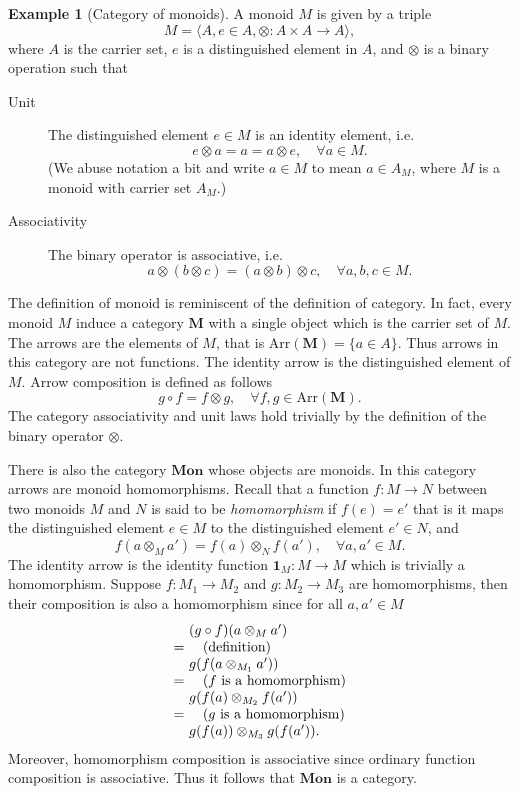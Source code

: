 \documentclass[10pt,twoside,a4paper]{article}
\makeatletter
\newcounter{theorem}
\theoremstyle{plain}
\theoremstyle{definition}
\newtheorem{example}{Example}[section]
\newcommand{\ba}{\begin{array}}
\newcommand{\ea}{\end{array}}
\newenvironment{derivation}{\small\[\ba{@{}r@{~}l@{}}}{\ea\]\normalsize\ignorespacesafterend}
\newcommand{\reason}[1]{\quad (\text{#1})}
\newcommand{\Id}[1]{%
  \ensuremath{\mathbf{1}_{#1}}%
}
\newcommand{\Arr}[1]{%
  \ensuremath{\mathrm{Arr}(#1)}%
}
\newcommand{\Catname}[1]{%
  \ensuremath{\mathbf{#1}}%
}
\newcommand{\Mon}[0]{\Catname{Mon}}
\newcommand{\Tuple}[1]{%
  \ensuremath{\langle #1 \rangle}%
}
\makeatother
\begin{document}
\begin{example}[Category of monoids]
A monoid $M$ is given by a triple
\[ M = \Tuple{A,e \in A, \otimes : A \times A \to A}, \]
where $A$ is the carrier set, $e$ is a distinguished element in $A$,
and $\otimes$ is a binary operation such that
\begin{description}
\item[Unit] The distinguished element $e \in M$ is an identity
  element, i.e.
  \[ e \otimes a = a = a \otimes e, \quad \forall a \in M. \]
  (We abuse notation a bit and write $a \in M$ to mean $a \in A_M$,
  where $M$ is a monoid with carrier set $A_M$.)
  \item[Associativity] The binary operator is associative, i.e.
    \[  a \otimes (b \otimes c) = (a \otimes b) \otimes c, \quad \forall a,b,c \in M. \]
\end{description}
The definition of monoid is reminiscent of the definition of
category. In fact, every monoid $M$ induce a category \Catname{M} with
a single object which is the carrier set of $M$. The arrows are the
elements of $M$, that is $\Arr{\Catname{M}} = \{ a \in A \}$. Thus
arrows in this category are not functions. The identity arrow is the
distinguished element of $M$. Arrow composition is defined as follows
%
\[ g \circ f = f \otimes g, \quad \forall f,g \in \Arr{\Catname{M}}. \]
%
The category associativity and unit laws hold trivially by the
definition of the binary operator $\otimes$.

There is also the category \Mon{} whose objects are monoids. In this
category arrows are monoid homomorphisms. Recall that a function
$f : M \to N$ between two monoids $M$ and $N$ is said to be
\emph{homomorphism} if $f(e) = e'$ that is it maps the distinguished
element $e \in M$ to the distinguished element $e' \in N$, and
%
\[ f(a \otimes_M a') = f(a) \otimes_N f(a'), \quad \forall a,a' \in M. \]
%
The identity arrow is the identity function $\Id{M} : M \to M$ which
is trivially a homomorphism. Suppose $f : M_1 \to M_2$ and
$g : M_2 \to M_3$ are homomorphisms, then their composition is also a
homomorphism since for all $a, a' \in M$
\begin{derivation}
  & (g \circ f)(a \otimes_M a') \\
  =& \reason{definition} \\
  & g(f(a \otimes_{M_1} a')) \\
  =& \reason{$f$ is a homomorphism} \\
  & g(f(a) \otimes_{M_2} f(a')) \\
  =& \reason{$g$ is a homomorphism} \\
  & g(f(a)) \otimes_{M_3} g(f(a')).
\end{derivation}
Moreover, homomorphism composition is associative since ordinary
function composition is associative. Thus it follows that \Mon{} is a
category.
\end{example}

%
%


\end{document}
